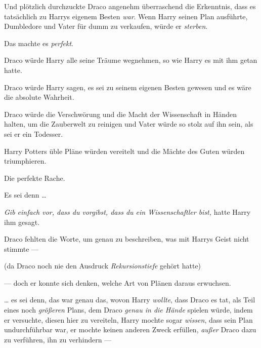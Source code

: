 Und plötzlich durchzuckte Draco angenehm überraschend die Erkenntnis, dass es tatsächlich zu Harrys eigenem Besten \emph{war}. Wenn Harry seinen Plan ausführte, Dumbledore und Vater für dumm zu verkaufen, würde er \emph{sterben}.

Das machte es \emph{perfekt}.

Draco würde Harry alle seine Träume wegnehmen, so wie Harry es mit ihm getan hatte.

Draco würde Harry sagen, es sei zu seinem eigenen Besten gewesen und es wäre die absolute Wahrheit.

Draco würde die Verschwörung und die Macht der Wissenschaft in Händen halten, um die Zauberwelt zu reinigen und Vater würde so stolz auf ihn sein, als sei er ein Todesser.

Harry Potters üble Pläne würden vereitelt und die Mächte des Guten würden triumphieren.

Die perfekte Rache.

Es sei denn …

\emph{Gib einfach vor, dass du vorgibst, dass du ein Wissenschaftler bist,} hatte Harry ihm gesagt.

Draco fehlten die Worte, um genau zu beschreiben, was mit Harrys Geist nicht stimmte —

(da Draco noch nie den Ausdruck \emph{Rekursionstiefe} gehört hatte)

— doch er konnte sich denken, welche Art von Plänen daraus erwuchsen.

… es sei denn, das war genau das, wovon Harry \emph{wollte}, dass Draco es tat, als Teil eines noch \emph{größeren} Plans, dem Draco \emph{genau in die Hände} spielen würde, indem er versuchte, diesen hier zu vereiteln, Harry mochte sogar \emph{wissen}, dass sein Plan undurchführbar war, er mochte keinen anderen Zweck erfüllen, \emph{außer} Draco dazu zu verführen, ihn zu verhindern —

